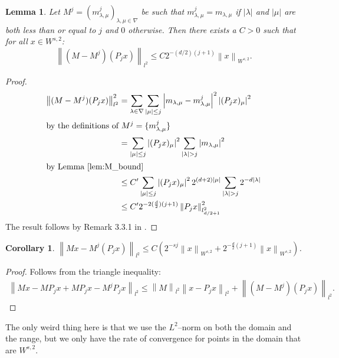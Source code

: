 \documentclass[12pt]{amsart}
\newtheorem{corollary}{Corollary}
\newtheorem{lemma}{Lemma}
\newcommand{\card}[1]{{\lvert#1\rvert}}
\newcommand{\abs}[1]{\ensuremath{\left\lvert #1\right\rvert}}
\newcommand{\norm}[1]{\ensuremath{\left\lVert #1\right\rVert}}
\begin{document}
\begin{lemma} 
	Let $M^j=(m^j_{\lambda,\mu})_{\lambda,\mu \in \nabla}$ be such that $m^j_{\lambda,\mu} = m_{\lambda,\mu}$ if $\card{\lambda}$ and $\card{\mu}$ are both less than or equal to $j$ and $0$ otherwise. Then there exists a $C > 0$ such that for all $x \in W^{s,2}$:
	\begin{equation}
		\norm{(M-M^j)(P_jx)}_{l^2} \leq C2^{-(d/2)(j+1)} \norm{x}_{W^{s,2}}.
	\end{equation}
\end{lemma}
\begin{proof}
	\begin{align}
		\norm{(M-M^j)(P_j x)}_{l^2}^2 &= \sum_{\lambda \in \nabla} \sum_{\card{\mu}\leq j} \abs{m_{\lambda,\mu}-m^j_{\lambda,\mu}}^2 \abs{(P_j x)_\mu}^2 \\
	\intertext{by the definitions of $M^j = \{ m_{\lambda,\mu}^j \}$ }
		&= \sum_{\card{\mu}\leq j}\abs{(P_j x)_\mu}^2 \sum_{\card{\lambda}>j}\abs{m_{\lambda,\mu}}^2 \\
	\intertext{by Lemma \ref{lem:M_bound}}
		&\leq C'\sum_{\card{\mu}\leq j}\abs{(P_j x)_\mu}^2 2^{(d+2)\card{\mu}}\sum_{\card{\lambda}>j}2^{-d\card{\lambda}} \\
		&\leq C' 2^{-2(\frac{d}{2})(j+1)}\norm{P_j x}^2_{l^2_{d/2+1}}
	\end{align}
	The result follows by Remark 3.3.1 in \cite{Cohen2003}.
\end{proof}

\begin{corollary}
	$\norm{Mx - M^j(P_j x)}_{l^2} \leq C \left( 2^{-sj}\norm{x}_{W^{s,2}} + 2^{-\frac{d}{2}(j+1)}\norm{x}_{W^{s,2}} \right)$.
\end{corollary}
\begin{proof}
	Follows from the triangle inequality:
	\begin{multline}
		\norm{Mx - M P_j x + M P_j x - M^j P_j x}_{l^2} \leq \norm{M}_{l^2} \norm{x - P_j x}_{l^2} + \norm{(M-M^j)(P_jx)}_{l^2}.
	\end{multline}
\end{proof}

The only weird thing here is that we use the $L^2$--norm on both the domain and the range, but we only have the rate of convergence for points in the domain that are $W^{s,2}$.
\end{document}
